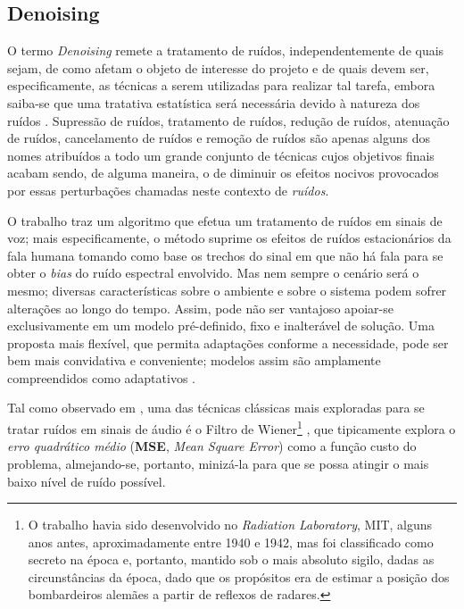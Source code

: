 \subsection{Denoising}
\label{subsec:bss_denoising}

O termo \textit{Denoising} remete a tratamento de ruídos, independentemente de quais sejam, de como afetam o objeto de interesse do projeto e de quais devem ser, especificamente, as técnicas a serem utilizadas para realizar tal tarefa, embora saiba-se que uma tratativa estatística será necessária devido à natureza dos ruídos \citep{watkinson2001art}. Supressão de ruídos, tratamento de ruídos, redução de ruídos, atenuação de ruídos, cancelamento de ruídos e remoção de ruídos são apenas alguns dos nomes atribuídos a todo um grande conjunto de técnicas cujos objetivos finais acabam sendo, de alguma maneira, o de diminuir os efeitos nocivos provocados por essas perturbações chamadas neste contexto de \textit{ruídos}.

O trabalho \citep{1163209} traz um algoritmo que efetua um tratamento de ruídos em sinais de voz; mais especificamente, o método suprime os efeitos de ruídos estacionários da fala humana tomando como base os trechos do sinal em que não há fala para se obter o \textit{bias} do ruído espectral envolvido. Mas nem sempre o cenário será o mesmo; diversas características sobre o ambiente e sobre o sistema podem sofrer alterações ao longo do tempo. Assim, pode não ser vantajoso apoiar-se exclusivamente em um modelo pré-definido, fixo e inalterável de solução. Uma proposta mais flexível, que permita adaptações conforme a necessidade, pode ser bem mais convidativa e conveniente; modelos assim são amplamente compreendidos como adaptativos \citep{1451965, 382009}.

Tal como observado em \citep{7805139, 6334422, 1643650, SPRIET20042367}, uma das técnicas clássicas mais exploradas para se tratar ruídos em sinais de áudio é o Filtro de Wiener\footnote{O trabalho havia sido desenvolvido no \textit{Radiation Laboratory}, MIT, alguns anos antes, aproximadamente entre 1940 e 1942, mas foi classificado como secreto na época e, portanto, mantido sob o mais absoluto sigilo, dadas as circunstâncias da época, dado que os propósitos era de estimar a posição dos bombardeiros alemães a partir de reflexos de radares.} \citep{6284754}, que tipicamente explora o \textit{erro quadrático médio} (\textbf{MSE}, \textit{Mean Square Error}) como a função custo do problema, almejando-se, portanto, minizá-la para que se possa atingir o mais baixo nível de ruído possível.

